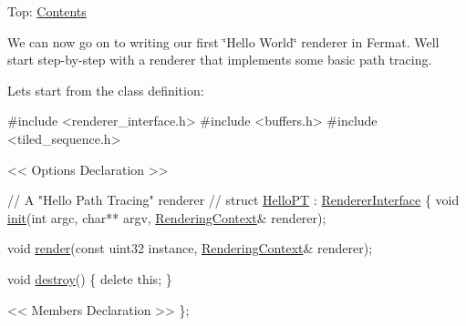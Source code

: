 Top\+: \hyperlink{_overture_contents_page}{Contents}

\begin{DoxyParagraph}{}
We can now go on to writing our first \char`\"{}\+Hello World\char`\"{} renderer in Fermat. We\textquotesingle{}ll start step-\/by-\/step with a renderer that implements some basic path tracing. 
\end{DoxyParagraph}
\begin{DoxyParagraph}{}
Let\textquotesingle{}s start from the class definition\+: ~\newline

\begin{DoxyCode}
\textcolor{preprocessor}{#include <renderer\_interface.h>}
\textcolor{preprocessor}{#include <buffers.h>}
\textcolor{preprocessor}{#include <tiled\_sequence.h>}

<< Options Declaration >>

\textcolor{comment}{// A "Hello Path Tracing" renderer}
\textcolor{comment}{//}
\textcolor{keyword}{struct }\hyperlink{struct_hello_p_t}{HelloPT} : \hyperlink{struct_renderer_interface}{RendererInterface}
\{
    \textcolor{keywordtype}{void} \hyperlink{struct_hello_p_t_a8ec59e3fac8eff801cecdd3220cd8d41}{init}(\textcolor{keywordtype}{int} argc, \textcolor{keywordtype}{char}** argv, \hyperlink{struct_rendering_context}{RenderingContext}& renderer);

    \textcolor{keywordtype}{void} \hyperlink{struct_hello_p_t_af772aac0d80118742450fd8b6b3c58c2}{render}(\textcolor{keyword}{const} uint32 instance, \hyperlink{struct_rendering_context}{RenderingContext}& renderer);

    \textcolor{keywordtype}{void} \hyperlink{struct_hello_p_t_ac81e09dcfb28dffc85aa6c4df06a4426}{destroy}() \{ \textcolor{keyword}{delete} \textcolor{keyword}{this}; \}

    << Members Declaration >>
\};
\end{DoxyCode}

\end{DoxyParagraph}
